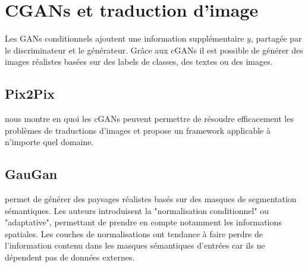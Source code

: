 \documentclass[a4paper, 12pt]{report}
\begin{document}
\section{CGANs et traduction d'image}

Les GANs conditionnels ajoutent une information supplémentaire $y$, partagée par le discriminateur et le générateur. Grâce aux cGANs il est possible de générer des images réalistes basées sur des labels de classes, des textes ou des images.

\subsection{Pix2Pix}
\cite{DBLP:journals/corr/GatysEB15a} nous montre en quoi les cGANs peuvent permettre de résoudre efficacement les problèmes de traductions d'images et propose un framework applicable à n'importe quel domaine.

\subsection{GauGan}
\cite{DBLP:journals/corr/abs-1903-07291} permet de générer des paysages réalistes basés sur des masques de segmentation sémantiques. Les auteurs introduisent la "normalisation conditionnel" ou "adaptative", permettant de prendre en compte notamment les informations spatiales.
Les couches de normalisations ont tendance à faire perdre de l'information contenu dans les masques sémantiques d'entrées car ils ne dépendent pas de données externes.
\end{document}
